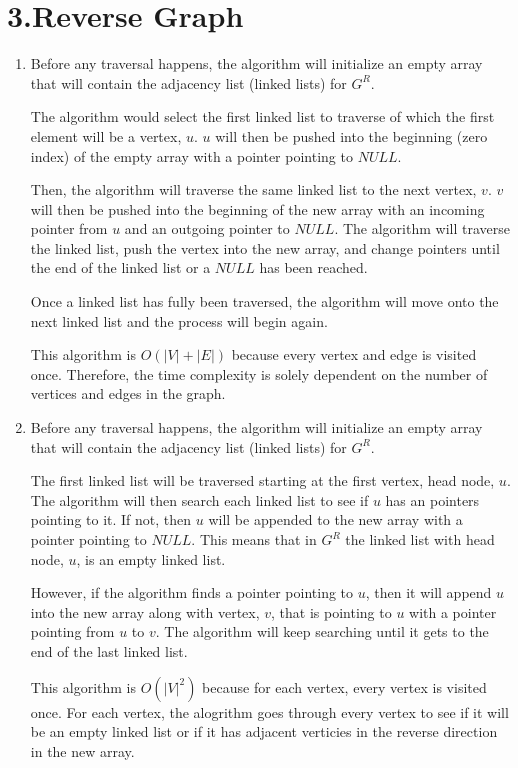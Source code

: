 \documentclass[11pt]{article}
\newenvironment{qparts}{\begin{enumerate}[{(}a{)}]}{\end{enumerate}}
\begin{document}
\newpage
\section*{3.Reverse Graph}
\begin{qparts}
\item

Before any traversal happens, the algorithm will initialize an empty array that will contain the adjacency list (linked lists) for $G^R$.

The algorithm would select the first linked list to traverse of which the first element will be a vertex, $u$. $u$ will then be pushed into the beginning (zero index) of the empty array with a pointer pointing to $NULL$. 

Then, the algorithm will traverse the same linked list to the next vertex, $v$. $v$ will then be pushed into the beginning of the new array with an incoming pointer from $u$ and an outgoing pointer to $NULL$. The algorithm will traverse the linked list, push the vertex into the new array, and change pointers until the end of the linked list or a $NULL$ has been reached. 

Once a linked list has fully been traversed, the algorithm will move onto the next linked list and the process will begin again.

This algorithm is $O(|V| + |E|)$ because every vertex and edge is visited once. Therefore, the time complexity is solely dependent on the number of vertices and edges in the graph. 


\item

Before any traversal happens, the algorithm will initialize an empty array that will contain the adjacency list (linked lists) for $G^R$.

The first linked list will be traversed starting at the first vertex, head node, $u$. The algorithm will then search each linked list to see if $u$ has an pointers pointing to it. If not, then $u$ will be appended to the new array with a pointer pointing to $NULL$. This means that in $G^{R}$ the linked list with head node, $u$, is an empty linked list. 

However, if the algorithm finds a pointer pointing to $u$, then it will append $u$ into the new array along with vertex, $v$, that is pointing to $u$ with a pointer pointing from $u$ to $v$. The algorithm will keep searching until it gets to the end of the last linked list. 

This algorithm is $O(|V|^{2})$ because for each vertex, every vertex is visited once. For each vertex, the alogrithm goes through every vertex to see if it will be an empty linked list or if it has adjacent verticies in the reverse direction in the new array.

\end{qparts}
\end{document}

